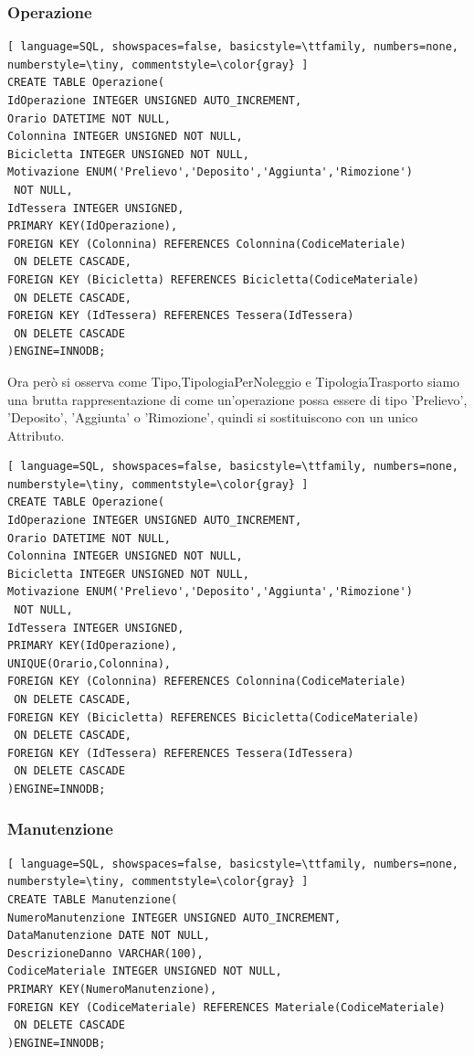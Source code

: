 \documentclass[a4paper,twoside]{article}
\begin{document}
\subsubsection{Operazione}
\begin{lstlisting}[ language=SQL, showspaces=false, basicstyle=\ttfamily, numbers=none, numberstyle=\tiny, commentstyle=\color{gray} ]
CREATE TABLE Operazione(
IdOperazione INTEGER UNSIGNED AUTO_INCREMENT,
Orario DATETIME NOT NULL,
Colonnina INTEGER UNSIGNED NOT NULL,
Bicicletta INTEGER UNSIGNED NOT NULL,
Motivazione ENUM('Prelievo','Deposito','Aggiunta','Rimozione')
 NOT NULL,
IdTessera INTEGER UNSIGNED,
PRIMARY KEY(IdOperazione),
FOREIGN KEY (Colonnina) REFERENCES Colonnina(CodiceMateriale)
 ON DELETE CASCADE,
FOREIGN KEY (Bicicletta) REFERENCES Bicicletta(CodiceMateriale)
 ON DELETE CASCADE,
FOREIGN KEY (IdTessera) REFERENCES Tessera(IdTessera)
 ON DELETE CASCADE
)ENGINE=INNODB;
\end{lstlisting}
Ora però si osserva come Tipo,TipologiaPerNoleggio e TipologiaTrasporto siamo una brutta rappresentazione di come un'operazione possa essere di tipo 'Prelievo', 'Deposito', 'Aggiunta' o 'Rimozione', quindi si sostituiscono con un unico Attributo.
\begin{lstlisting}[ language=SQL, showspaces=false, basicstyle=\ttfamily, numbers=none, numberstyle=\tiny, commentstyle=\color{gray} ]
CREATE TABLE Operazione(
IdOperazione INTEGER UNSIGNED AUTO_INCREMENT,
Orario DATETIME NOT NULL,
Colonnina INTEGER UNSIGNED NOT NULL,
Bicicletta INTEGER UNSIGNED NOT NULL,
Motivazione ENUM('Prelievo','Deposito','Aggiunta','Rimozione')
 NOT NULL,
IdTessera INTEGER UNSIGNED,
PRIMARY KEY(IdOperazione),
UNIQUE(Orario,Colonnina),
FOREIGN KEY (Colonnina) REFERENCES Colonnina(CodiceMateriale)
 ON DELETE CASCADE,
FOREIGN KEY (Bicicletta) REFERENCES Bicicletta(CodiceMateriale)
 ON DELETE CASCADE,
FOREIGN KEY (IdTessera) REFERENCES Tessera(IdTessera)
 ON DELETE CASCADE
)ENGINE=INNODB;
\end{lstlisting}
\subsubsection{Manutenzione}
\begin{lstlisting}[ language=SQL, showspaces=false, basicstyle=\ttfamily, numbers=none, numberstyle=\tiny, commentstyle=\color{gray} ]
CREATE TABLE Manutenzione(
NumeroManutenzione INTEGER UNSIGNED AUTO_INCREMENT,
DataManutenzione DATE NOT NULL,
DescrizioneDanno VARCHAR(100),
CodiceMateriale INTEGER UNSIGNED NOT NULL,
PRIMARY KEY(NumeroManutenzione),
FOREIGN KEY (CodiceMateriale) REFERENCES Materiale(CodiceMateriale)
 ON DELETE CASCADE
)ENGINE=INNODB;
\end{lstlisting}
\end{document}

